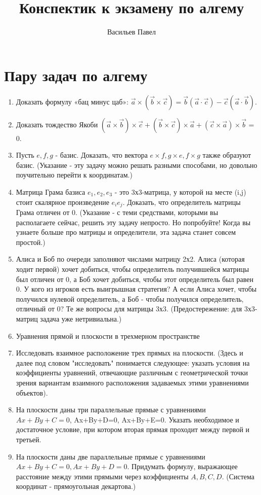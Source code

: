 \documentclass[a4paper]{article}
\title{Конспектик к экзамену по алгему}
\author{Васильев Павел}
\begin{document}
\section*{Пару задач по алгему}

\begin{enumerate}


\item Доказать формулу «бац минус цаб»: $\vec{a} \times (\vec{b} \times \vec{c}) = \vec{b}(\vec{a} \cdot \vec{c}) - \vec{c}(\vec{a} \cdot \vec{b})$.
\item Доказать тождество Якоби $(\vec{a} \times \vec{b}) \times \vec{c} + (\vec{b} \times \vec{c}) \times \vec{a} + (\vec{c} \times \vec{a}) \times \vec{b}$ = 0.
\item Пусть $e, f, g$  - базис. Доказать, что вектора $e \times f, g \times e, f \times g$ также образуют базис. (Указание - эту задачу можно решать разными способами, но довольно поучительно перейти к координатам.)
\item Матрица Грама базиса $e_1,e_2,e_3$ - это 3х3-матрица, у которой на месте (i,j) стоит скалярное произведение $e_ie_j$. Доказать, что определитель матрицы Грама отличен от 0. (Указание - с теми средствами, которыми вы располагаете сейчас, решить эту задачу непросто. Но попробуйте! Когда вы узнаете больше про матрицы и определители, эта задача станет совсем простой.)
\item Алиса и Боб по очереди заполняют числами матрицу 2х2. Алиса (которая ходит первой) хочет добиться, чтобы определитель получившейся матрицы был отличен от 0, а Боб хочет добиться, чтобы этот определитель был равен 0. У кого из игроков есть выигрышная стратегия? А если Алиса хочет, чтобы получился нулевой определитель, а Боб - чтобы получился определитель, отличный от 0? Те же вопросы для матрицы 3х3. (Предостережение: для 3х3-матриц задача уже нетривиальна.)
\item Уравнения прямой и плоскости в трехмерном пространстве
\item Исследовать взаимное расположение трех прямых на плоскости. (Здесь и далее под словом "исследовать" понимается следующее: указать условия на коэффициенты уравнений, отвечающие различным с геометрической точки зрения вариантам взаимного расположения задаваемых этими уравнениями объектов).
\item На плоскости даны три параллельные прямые с уравнениями $Ax+By+C=0$, Ax+By+D=0, Ax+By+E=0. Указать необходимое и достаточное условие, при котором вторая прямая проходит между первой и третьей.
\item На плоскости даны две параллельные прямые с уравнениями $Ax+By+C=0, Ax+By+D=0$. Придумать формулу, выражающее расстояние между этими прямыми через коэффициенты $A,B,C,D$. (Система координат - прямоугольная декартова.)

\end{enumerate}
\end{document}
